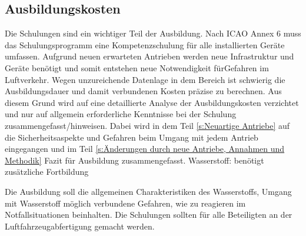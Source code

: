 \subsection{Ausbildungskosten}

Die Schulungen sind ein wichtiger Teil der Ausbildung. 
Nach ICAO Annex 6 muss das Schulungsprogramm eine Kompetenzschulung für alle installierten Geräte umfassen.
Aufgrund neuen erwarteten Antrieben werden neue Infrastruktur und Geräte benötigt und somit entstehen neue Notwendigkeit fürGefahren im Luftverkehr. 
%
Wegen unzureichende Datenlage in dem Bereich ist schwierig die Ausbildungsdauer und damit verbundenen Kosten präzise zu berechnen.
Aus diesem Grund wird auf eine detaillierte Analyse der Ausbildungskosten verzichtet und nur auf allgemein erforderliche Kenntnisse bei
der Schulung zusammengefasst/hinweisen. Dabei wird in dem Teil \ref{s:Neuartige Antriebe} auf die Sicherheitsaspekte und Gefahren 
beim Umgang mit jedem Antrieb eingegangen und im Teil 
\ref{s:Änderungen durch neue Antriebe, Annahmen und Methodik} Fazit für Ausbildung zusammengefasst. %
Wasserstoff: benötigt zusätzliche Fortbildung 

Die Ausbildung soll die allgemeinen Charakteristiken des Wasserstoffs, Umgang mit Wasserstoff möglich verbundene Gefahren, wie zu reagieren im Notfallsituationen
beinhalten. %
Die Schulungen sollten für alle Beteiligten an der Luftfahrzeugabfertigung gemacht werden.
